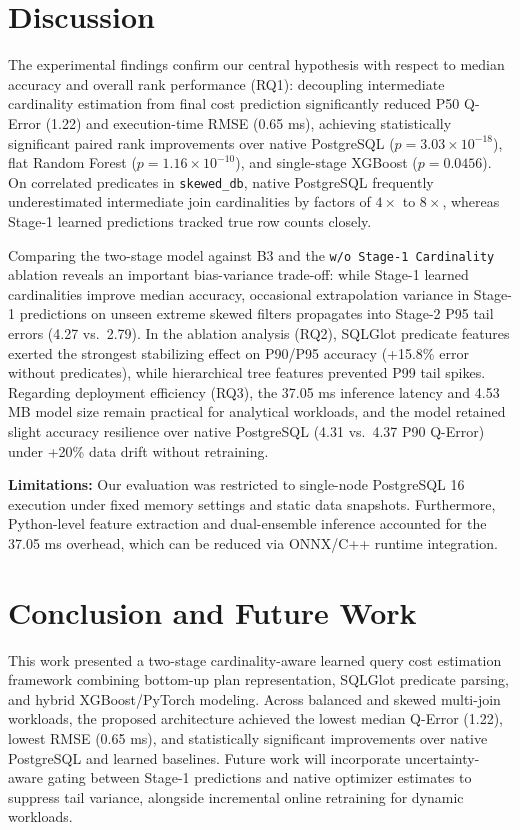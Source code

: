 \documentclass[conference]{IEEEtran}
\begin{document}
\section{Discussion}
The experimental findings confirm our central hypothesis with respect to median accuracy and overall rank performance (RQ1): decoupling intermediate cardinality estimation from final cost prediction significantly reduced P50 Q-Error (1.22) and execution-time RMSE (0.65 ms), achieving statistically significant paired rank improvements over native PostgreSQL ($p = 3.03 \times 10^{-18}$), flat Random Forest ($p = 1.16 \times 10^{-10}$), and single-stage XGBoost ($p = 0.0456$). On correlated predicates in \texttt{skewed\_db}, native PostgreSQL frequently underestimated intermediate join cardinalities by factors of $4\times$ to $8\times$, whereas Stage-1 learned predictions tracked true row counts closely.

Comparing the two-stage model against B3 and the \texttt{w/o Stage-1 Cardinality} ablation reveals an important bias-variance trade-off: while Stage-1 learned cardinalities improve median accuracy, occasional extrapolation variance in Stage-1 predictions on unseen extreme skewed filters propagates into Stage-2 P95 tail errors (4.27 vs.\ 2.79). In the ablation analysis (RQ2), SQLGlot predicate features exerted the strongest stabilizing effect on P90/P95 accuracy (+15.8\% error without predicates), while hierarchical tree features prevented P99 tail spikes. Regarding deployment efficiency (RQ3), the 37.05 ms inference latency and 4.53 MB model size remain practical for analytical workloads, and the model retained slight accuracy resilience over native PostgreSQL (4.31 vs.\ 4.37 P90 Q-Error) under +20\% data drift without retraining.

\textbf{Limitations:} Our evaluation was restricted to single-node PostgreSQL 16 execution under fixed memory settings and static data snapshots. Furthermore, Python-level feature extraction and dual-ensemble inference accounted for the 37.05 ms overhead, which can be reduced via ONNX/C++ runtime integration.

\section{Conclusion and Future Work}
This work presented a two-stage cardinality-aware learned query cost estimation framework combining bottom-up plan representation, SQLGlot predicate parsing, and hybrid XGBoost/PyTorch modeling. Across balanced and skewed multi-join workloads, the proposed architecture achieved the lowest median Q-Error (1.22), lowest RMSE (0.65 ms), and statistically significant improvements over native PostgreSQL and learned baselines. Future work will incorporate uncertainty-aware gating between Stage-1 predictions and native optimizer estimates to suppress tail variance, alongside incremental online retraining for dynamic workloads.
\end{document}
